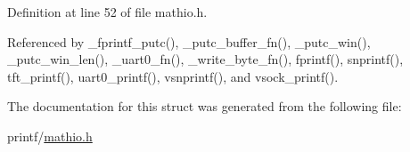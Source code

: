 Definition at line 52 of file mathio.\+h.



Referenced by \+\_\+fprintf\+\_\+putc(), \+\_\+putc\+\_\+buffer\+\_\+fn(), \+\_\+putc\+\_\+win(), \+\_\+putc\+\_\+win\+\_\+len(), \+\_\+uart0\+\_\+fn(), \+\_\+write\+\_\+byte\+\_\+fn(), fprintf(), snprintf(), tft\+\_\+printf(), uart0\+\_\+printf(), vsnprintf(), and vsock\+\_\+printf().



The documentation for this struct was generated from the following file\+:\begin{DoxyCompactItemize}
\item 
printf/\hyperlink{mathio_8h}{mathio.\+h}\end{DoxyCompactItemize}
